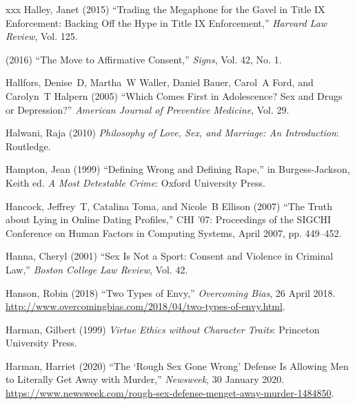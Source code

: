 \documentclass[]{jlreq} \usepackage{mystyle}
\begin{document}
\begin{thebibliography}{xxx}
Halley, Janet (2015) ``Trading the Megaphone for the Gavel in Title IX
  Enforcement: Backing Off the Hype in Title IX Enforcement,'' \textit{ Harvard
  Law Review}, Vol. 125.

 \bysame{}  (2016) ``The Move to Affirmative Consent,'' \textit{ Signs}, Vol.
  42, No. 1.

Hallfors, Denise~D, Martha~W Waller, Daniel Bauer, Carol~A Ford, and Carolyn~T
  Halpern (2005) ``Which Comes First in Adolescence? Sex and Drugs or
  Depression?'' \textit{ American Journal of Preventive Medicine}, Vol. 29.

Halwani, Raja (2010)  \textit{ Philosophy of Love, Sex, and Marriage: An
  Introduction}: Routledge.

Hampton, Jean (1999) ``Defining Wrong and Defining Rape,'' in Burgess-Jackson,
  Keith ed.   \textit{ A Most Detestable Crime}: Oxford University Press.

Hancock, Jeffrey~T, Catalina Toma, and Nicole~B Ellison (2007) ``The Truth
  about Lying in Online Dating Profiles,'' CHI '07: Proceedings of the SIGCHI
  Conference on Human Factors in Computing Systems, April 2007, pp. 449–452.

Hanna, Cheryl (2001) ``Sex Is Not a Sport: Consent and Violence in Criminal
  Law,'' \textit{ Boston College Law Review}, Vol. 42.

Hanson, Robin (2018) ``Two Types of Envy,'' \emph{Overcoming Bias}, 26 April
  2018. \url{http://www.overcomingbias.com/2018/04/two-types-of-envy.html}.

Harman, Gilbert (1999)  \textit{ Virtue Ethics without Character Traits}:
  Princeton University Press.

Harman, Harriet (2020) ``The `Rough Sex Gone Wrong' Defense Is Allowing Men to
  Literally Get Away with Murder,'' \emph{Newsweek}, 30 January 2020.
  \url{https://www.newsweek.com/rough-sex-defense-menget-away-murder-1484850}.


\end{thebibliography}
\end{document}
